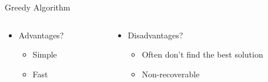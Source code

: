 \documentclass[aspectratio=169]{beamer}
\begin{document}
\begin{frame}{Greedy Algorithm}

\begin{columns}
\begin{column}{0.5\textwidth}
\begin{itemize}
\item Advantages?
\begin{itemize}
\item Simple
\item Fast
\end{itemize}
\end{itemize}
\end{column}
\begin{column}{0.5\textwidth}
\begin{itemize}
\item Disadvantages?
\begin{itemize}
\item Often don't find the best solution
\item Non-recoverable %
\end{itemize}
\end{itemize}
\end{column}
\end{columns}

\end{frame}
\end{document}
